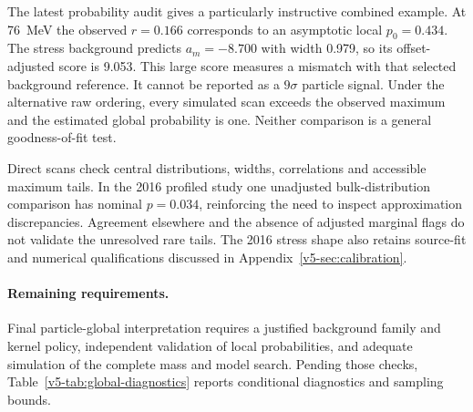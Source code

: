 The latest probability audit gives a particularly instructive combined
example. At 76~MeV the observed $r=0.166$ corresponds to an asymptotic local
$p_0=0.434$. The stress background predicts $a_m=-8.700$ with width 0.979,
so its offset-adjusted score is 9.053. This large score measures a
mismatch with that selected background reference. It cannot be reported
as a $9\sigma$ particle signal. Under the alternative raw ordering, every
simulated scan exceeds the observed maximum and the estimated global
probability is one. Neither comparison is a general goodness-of-fit test.

Direct scans check central distributions, widths, correlations and
accessible maximum tails. In the 2016 profiled study one unadjusted
bulk-distribution comparison has nominal $p=0.034$, reinforcing the need
to inspect approximation discrepancies. Agreement elsewhere and the
absence of adjusted marginal flags do not validate the unresolved rare
tails. The 2016 stress shape also retains source-fit and numerical
qualifications discussed in Appendix~\ref{v5-sec:calibration}.

\enlargethispage{\baselineskip}
\paragraph{Remaining requirements.}
Final particle-global interpretation requires a justified background family
and kernel policy, independent validation of local probabilities, and adequate
simulation of the complete mass and model search. Pending those checks,
Table~\ref{v5-tab:global-diagnostics} reports conditional diagnostics and
sampling bounds.
